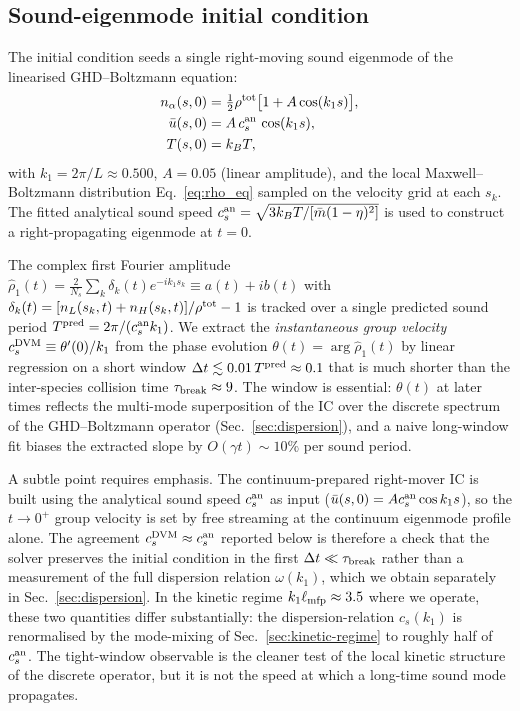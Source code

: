 \documentclass[aps,pre,twocolumn,superscriptaddress,longbibliography,floatfix]{revtex4-2}
\begin{document}
\subsection{Sound-eigenmode initial condition}

The initial condition seeds a single right-moving sound
eigenmode of the linearised GHD--Boltzmann equation:
\begin{align}
n_\alpha(s,0) &= \tfrac12\rho^{\rm tot}
   \bigl[1 + A\cos(k_1 s)\bigr], \\
\bar u(s,0)   &= A\,c_s^{\rm an}\,\cos(k_1 s),\\
T(s,0)        &= k_BT,
\end{align}
with $k_1=2\pi/L\approx 0.500$, $A=0.05$ (linear amplitude),
and the local Maxwell--Boltzmann distribution
Eq.~\eqref{eq:rho_eq} sampled on the velocity grid at each
$s_k$. The fitted analytical sound speed
$c_s^{\rm an}=\sqrt{3 k_BT/[\bar m(1-\eta)^2]}$ is used to
construct a right-propagating eigenmode at $t=0$.

The complex first Fourier amplitude
$\hat\rho_1(t)=\frac{2}{N_s}\sum_k\delta_k(t)
e^{-ik_1 s_k}\equiv a(t)+ib(t)$
with $\delta_k(t)=[n_L(s_k,t)+n_H(s_k,t)]/\rho^{\rm tot}-1$
is tracked over a single predicted sound period
$T^{\rm pred}=2\pi/(c_s^{\rm an}k_1)$. We extract the
\emph{instantaneous group velocity}
$c_s^{\rm DVM}\equiv\theta'(0)/k_1$ from the phase
evolution $\theta(t)=\arg\hat\rho_1(t)$ by linear regression
on a short window $\Delta t\lesssim 0.01\,T^{\rm pred}\approx 0.1$
that is much shorter than the inter-species collision time
$\tau_{\rm break}\approx 9$. The window is essential:
$\theta(t)$ at later times reflects the multi-mode
superposition of the IC over the discrete spectrum of the
GHD--Boltzmann operator (Sec.~\ref{sec:dispersion}), and a
naive long-window fit biases the extracted slope by
$O(\gamma t)\sim 10\%$ per sound period.

A subtle point requires emphasis. The continuum-prepared
right-mover IC is built using the analytical sound speed
$c_s^{\rm an}$ as input
($\bar u(s,0)=A c_s^{\rm an}\cos k_1 s$), so the
$t\to 0^+$ group velocity is set by free streaming at the
continuum eigenmode profile alone. The agreement
$c_s^{\rm DVM}\approx c_s^{\rm an}$ reported below is
therefore a check that the solver preserves the initial
condition in the first $\Delta t\ll \tau_{\rm break}$ rather
than a measurement of the full dispersion relation
$\omega(k_1)$, which we obtain separately in
Sec.~\ref{sec:dispersion}. In the kinetic regime
$k_1\ell_{\rm mfp}\approx 3.5$ where we operate, these two
quantities differ substantially: the dispersion-relation
$c_s(k_1)$ is renormalised by the mode-mixing of
Sec.~\ref{sec:kinetic-regime} to roughly half of
$c_s^{\rm an}$. The tight-window observable is the cleaner
test of the local kinetic structure of the discrete
operator, but it is not the speed at which a long-time
sound mode propagates.
\medskip
\end{document}
